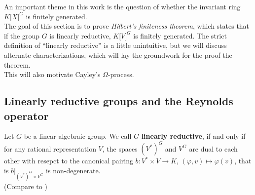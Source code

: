 An important theme in this work is the question of whether the invariant ring $ K\lbrack X\rbrack^G $ is finitely generated.  \\
The goal of this section is to prove \textit{Hilbert's finiteness theorem}, which states that if the group $G$ is linearly reductive, $ K\lbrack V\rbrack^G $ is finitely generated.
The strict definition of ``linearly reductive'' is a little unintuitive, but we will discuss alternate characterizations, which will lay the groundwork for the proof the theorem.  \\
This will also motivate Cayley's $\Omega$-process.

\subsection{Linearly reductive groups and the Reynolds operator}

\begin{definition}
  Let $G$ be a linear algebraic group.
  We call $G$ \textbf{linearly reductive}, if and only if for any rational representation $V$, the spaces $(V^\ast)^G$ and $V^G$ are dual to each other with resepct to the canonical pairing $b \colon V^\ast \times V \rightarrow K$, $(\varphi,v) \mapsto \varphi(v)$, that is $\left. b \right|_{(V^\ast)^G \times V^G}$ is non-degenerate.  \\
  (Compare to \cite[2.2.1, 2.2.5 (a)$\implies$(b)]{DK15})
\end{definition}


